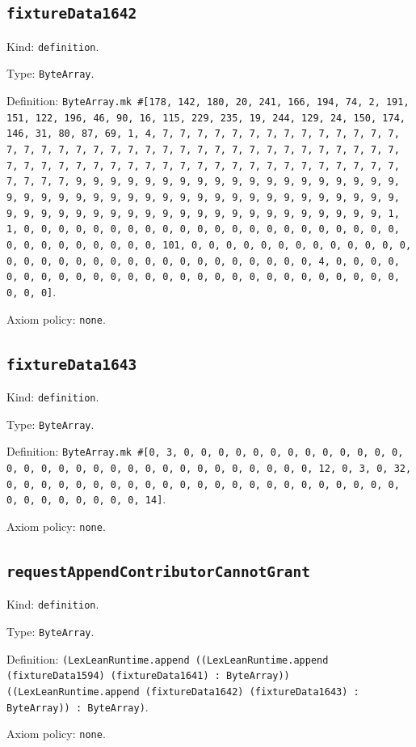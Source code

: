 \documentclass[11pt]{article}
\begin{document}
\subsection*{\texttt{fixtureData1642}}
\noindent Kind: \texttt{definition}.\par
\noindent Type: \texttt{ByteArray}.\par
\noindent Definition: \texttt{ByteArray.mk \#[178, 142, 180, 20, 241, 166, 194, 74, 2, 191, 151, 122, 196, 46, 90, 16, 115, 229, 235, 19, 244, 129, 24, 150, 174, 146, 31, 80, 87, 69, 1, 4, 7, 7, 7, 7, 7, 7, 7, 7, 7, 7, 7, 7, 7, 7, 7, 7, 7, 7, 7, 7, 7, 7, 7, 7, 7, 7, 7, 7, 7, 7, 7, 7, 7, 7, 7, 7, 7, 7, 7, 7, 7, 7, 7, 7, 7, 7, 7, 7, 7, 7, 7, 7, 7, 7, 7, 7, 7, 7, 7, 7, 7, 7, 7, 7, 9, 9, 9, 9, 9, 9, 9, 9, 9, 9, 9, 9, 9, 9, 9, 9, 9, 9, 9, 9, 9, 9, 9, 9, 9, 9, 9, 9, 9, 9, 9, 9, 9, 9, 9, 9, 9, 9, 9, 9, 9, 9, 9, 9, 9, 9, 9, 9, 9, 9, 9, 9, 9, 9, 9, 9, 9, 9, 9, 9, 9, 9, 9, 9, 1, 1, 0, 0, 0, 0, 0, 0, 0, 0, 0, 0, 0, 0, 0, 0, 0, 0, 0, 0, 0, 0, 0, 0, 0, 0, 0, 0, 0, 0, 0, 0, 0, 101, 0, 0, 0, 0, 0, 0, 0, 0, 0, 0, 0, 0, 0, 0, 0, 0, 0, 0, 0, 0, 0, 0, 0, 0, 0, 0, 0, 0, 0, 0, 0, 4, 0, 0, 0, 0, 0, 0, 0, 0, 0, 0, 0, 0, 0, 0, 0, 0, 0, 0, 0, 0, 0, 0, 0, 0, 0, 0, 0, 0, 0, 0]}.\par
\noindent Axiom policy: \texttt{none}.\par
\subsection*{\texttt{fixtureData1643}}
\noindent Kind: \texttt{definition}.\par
\noindent Type: \texttt{ByteArray}.\par
\noindent Definition: \texttt{ByteArray.mk \#[0, 3, 0, 0, 0, 0, 0, 0, 0, 0, 0, 0, 0, 0, 0, 0, 0, 0, 0, 0, 0, 0, 0, 0, 0, 0, 0, 0, 0, 0, 0, 0, 0, 12, 0, 3, 0, 32, 0, 0, 0, 0, 0, 0, 0, 0, 0, 0, 0, 0, 0, 0, 0, 0, 0, 0, 0, 0, 0, 0, 0, 0, 0, 0, 0, 0, 0, 0, 0, 14]}.\par
\noindent Axiom policy: \texttt{none}.\par
\subsection*{\texttt{requestAppendContributorCannotGrant}}
\noindent Kind: \texttt{definition}.\par
\noindent Type: \texttt{ByteArray}.\par
\noindent Definition: \texttt{(LexLeanRuntime.append ((LexLeanRuntime.append (fixtureData1594) (fixtureData1641) : ByteArray)) ((LexLeanRuntime.append (fixtureData1642) (fixtureData1643) : ByteArray)) : ByteArray)}.\par
\noindent Axiom policy: \texttt{none}.\par
\end{document}
